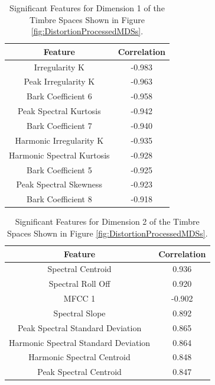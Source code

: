 	\begin{table}[h!]
		\centering
		\begin{tabular}{|c|c|}
			\hline
			\bf{Feature} & \bf{Correlation} \\
			\hline
			\hline
			Irregularity K & -0.983 \\
			\hline
			Peak Irregularity K & -0.963 \\
			\hline
			Bark Coefficient 6 & -0.958 \\
			\hline
			Peak Spectral Kurtosis & -0.942 \\
			\hline
			Bark Coefficient 7 & -0.940 \\
			\hline
			Harmonic Irregularity K & -0.935 \\
			\hline
			Harmonic Spectral Kurtosis & -0.928 \\
			\hline
			Bark Coefficient 5 & -0.925 \\
			\hline
			Peak Spectral Skewness & -0.923 \\
			\hline
			Bark Coefficient 8 & -0.918 \\
			\hline
		\end{tabular}
		\caption{Significant Features for Dimension 1 of the Timbre Spaces Shown in Figure 
			 \ref{fig:DistortionProcessedMDSs}.}
		\label{tab:DistortionProcessedFeaturesDim1}
	\end{table}

	\begin{table}[h!]
		\centering
		\begin{tabular}{|c|c|}
			\hline
			\bf{Feature} & \bf{Correlation} \\
			\hline
			\hline
			Spectral Centroid &  0.936 \\
			\hline
			Spectral Roll Off &  0.920 \\
			\hline
			MFCC 1 & -0.902 \\
			\hline
			Spectral Slope &  0.892 \\
			\hline
			Peak Spectral Standard Deviation &  0.865 \\
			\hline
			Harmonic Spectral Standard Deviation &  0.864 \\
			\hline
			Harmonic Spectral Centroid &  0.848 \\
			\hline
			Peak Spectral Centroid &  0.847 \\
			\hline
		\end{tabular}
		\caption{Significant Features for Dimension 2 of the Timbre Spaces Shown in Figure 
			 \ref{fig:DistortionProcessedMDSs}.}
		\label{tab:DistortionProcessedFeaturesDim2}
	\end{table}

